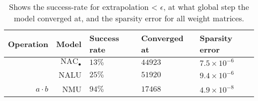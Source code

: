 \begin{table}[H]

\caption{\label{tab:very-simple-function-results}Shows the success-rate for extrapolation < $\epsilon$, at what global step the model converged at, and the sparsity error for all weight matrices.}
\centering
\begin{tabular}{rrlll}
\toprule
Operation & Model & Success rate & Converged at & Sparsity error\\
\midrule
 & ${\mathrm{NAC}_\bullet}$ & $13\%$ & $44923$ & $7.5 \times 10^{-6}$\\

 & NALU & $25\%$ & $51920$ & $9.4 \times 10^{-6}$\\

\multirow{-3}{*}{\raggedleft\arraybackslash $a \cdot b$} & NMU & $94\%$ & $17468$ & $4.9 \times 10^{-8}$\\
\bottomrule
\end{tabular}
\end{table}
